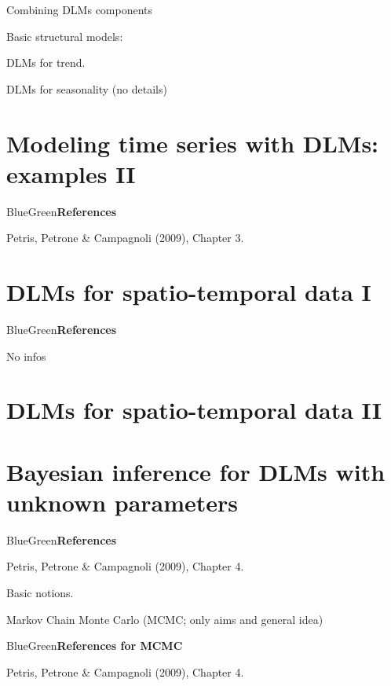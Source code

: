 \documentclass[dvipsnames,12pt]{book}
\begin{document}
        Combining DLMs components

        Basic structural models:

        DLMs for trend.

        DLMs for seasonality (no details)

    \chapter{Modeling time series with DLMs: examples II}

        \begin{mybox}{BlueGreen}{\textbf{References}}

            Petris, Petrone \& Campagnoli (2009), Chapter 3.
            
        \end{mybox}


    \chapter{DLMs for spatio-temporal data I}

        \begin{mybox}{BlueGreen}{\textbf{References}}

            No infos
            
        \end{mybox}

    \chapter{DLMs for spatio-temporal data II}


    \chapter[Bayesian inference for DLMs]{Bayesian inference for DLMs with unknown parameters}

        \begin{mybox}{BlueGreen}{\textbf{References}}

            Petris, Petrone \& Campagnoli (2009), Chapter 4.
            
        \end{mybox}

        Basic notions.
    
        Markov Chain Monte Carlo (MCMC; only aims and general idea)

        \begin{mybox}{BlueGreen}{\textbf{References for MCMC}}

            Petris, Petrone \& Campagnoli (2009), Chapter 4.
            
        \end{mybox}
\end{document}
